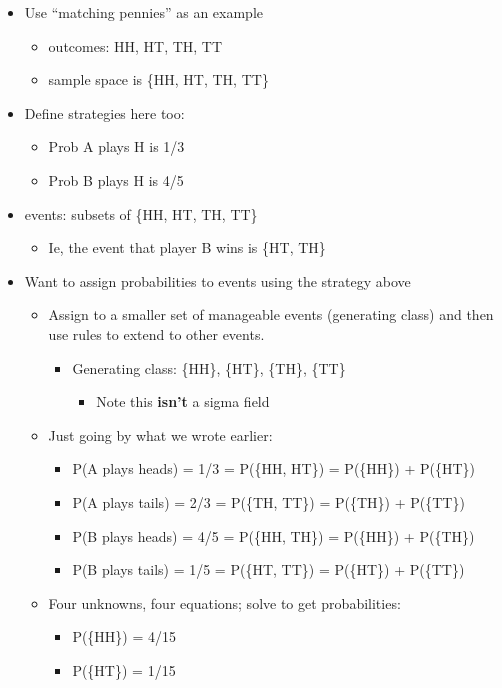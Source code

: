\documentclass[11pt]{article}
\begin{document}
\begin{itemize}
\item Use ``matching pennies'' as an example
\begin{itemize}
\item outcomes: HH, HT, TH, TT
\item sample space is \{HH, HT, TH, TT\}
\end{itemize}
\item Define strategies here too:
\begin{itemize}
\item Prob A plays H is 1/3
\item Prob B plays H is 4/5
\end{itemize}
\item events: subsets of \{HH, HT, TH, TT\}
\begin{itemize}
\item Ie, the event that player B wins is \{HT, TH\}
\end{itemize}
\item Want to assign probabilities to events using the strategy above
\begin{itemize}
\item Assign to a smaller set of manageable events (generating
          class) and then use rules to extend to other events.
\begin{itemize}
\item Generating class: \{{HH\}, \{HT\}, \{TH\}, \{TT\}}
\begin{itemize}
\item Note this \textbf{isn't} a sigma field
\end{itemize}
\end{itemize}
\item Just going by what we wrote earlier:
\begin{itemize}
\item P(A plays heads) = 1/3 = P(\{HH, HT\}) = P(\{HH\}) + P(\{HT\})
\item P(A plays tails) = 2/3 = P(\{TH, TT\}) = P(\{TH\}) + P(\{TT\})
\item P(B plays heads) = 4/5 = P(\{HH, TH\}) = P(\{HH\}) + P(\{TH\})
\item P(B plays tails) = 1/5 = P(\{HT, TT\}) = P(\{HT\}) + P(\{TT\})
\end{itemize}
\item Four unknowns, four equations; solve to get probabilities:
\begin{itemize}
\item P(\{HH\}) = 4/15
\item P(\{HT\}) = 1/15

\end{itemize}
\end{itemize}
\end{itemize}
\end{document}
